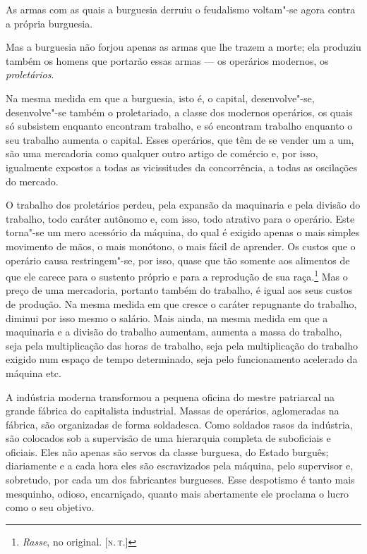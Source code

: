 As armas com as quais a burguesia derruiu o feudalismo voltam"-se agora     \label{4}
contra a própria burguesia.

Mas a burguesia não forjou apenas as armas que lhe trazem a morte; ela
produziu também os homens que portarão essas armas  ---  os operários
modernos, os \textit{proletários}.

Na mesma medida em que a burguesia, isto é, o capital, desenvolve"-se,
desenvolve"-se também o proletariado, a classe dos modernos operários,
os quais só subsistem enquanto encontram trabalho, e só encontram
trabalho enquanto o seu trabalho aumenta o capital. Esses operários,
que têm de se vender um a um, são uma mercadoria como qualquer outro
artigo de comércio e, por isso, igualmente expostos a todas as
vicissitudes da concorrência, a todas as oscilações do mercado.

O trabalho dos proletários perdeu, pela expansão da maquinaria e
pela divisão do trabalho, todo caráter autônomo e, com isso, todo
atrativo para o operário. Este torna"-se um mero acessório da máquina,
do qual é exigido apenas o mais simples movimento de mãos, o mais
monótono, o mais fácil de aprender. Os custos que o operário causa
restringem"-se, por isso, quase que tão somente aos alimentos de que
ele carece para o sustento próprio e para a reprodução de sua
raça.\footnote{\textit{Rasse}, no original. [\textsc{n.\,t.}]}
Mas o preço de uma mercadoria, portanto também do trabalho, é
igual aos seus custos de produção. Na mesma medida em que cresce o
caráter repugnante do trabalho, diminui por isso mesmo o salário. Mais
ainda, na mesma medida em que a maquinaria e a divisão do trabalho
aumentam, aumenta a massa do trabalho, seja pela multiplicação das
horas de trabalho, seja pela multiplicação do trabalho exigido num
espaço de tempo determinado, seja pelo funcionamento acelerado da
máquina etc.


A indústria moderna transformou a pequena oficina do mestre patriarcal
na grande fábrica do capitalista industrial. Massas de operários,
aglomeradas na fábrica, são organizadas de forma soldadesca. Como
soldados rasos da indústria, são colocados sob a supervisão de uma
hierarquia completa de suboficiais e oficiais. Eles não apenas são
servos da classe burguesa, do Estado burguês; diariamente e a cada hora
eles são escravizados pela máquina, pelo supervisor e, sobretudo, por
cada um dos fabricantes burgueses. Esse despotismo é tanto mais
mesquinho, odioso, encarniçado, quanto mais abertamente ele proclama o
lucro como o seu objetivo.


